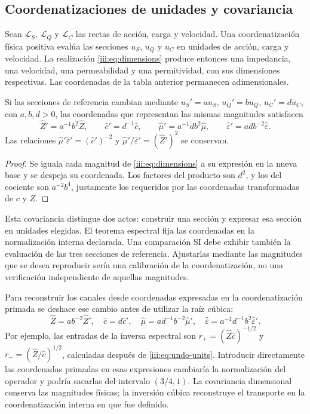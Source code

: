 \subsection{Coordenatizaciones de unidades y covariancia}

Sean $\mathcal L_S$, $\mathcal L_Q$ y $\mathcal L_C$ las rectas de
acción, carga y velocidad. Una coordenatización física positiva evalúa las secciones
$u_S$, $u_Q$ y $u_C$ en unidades de acción, carga y velocidad. La realización
\eqref{iii:eq:dimensions} produce entonces una impedancia, una velocidad,
una permeabilidad y una permitividad, con sus dimensiones respectivas.
Las coordenadas de la tabla anterior permanecen adimensionales.

\begin{proposition}
Si las secciones de referencia cambian mediante
$u_S'=a u_S$, $u_Q'=b u_Q$, $u_C'=d u_C$, con $a,b,d>0$, las
coordenadas que representan las mismas magnitudes satisfacen
\[
 \widehat Z'=a^{-1}b^2\widehat Z,\qquad
 \widehat c'=d^{-1}\widehat c,\qquad
 \widehat\mu'=a^{-1}db^2\widehat\mu,\qquad
 \widehat\varepsilon'=adb^{-2}\widehat\varepsilon.
\]
Las relaciones $\widehat\mu'\widehat\varepsilon'=(\widehat c')^{-2}$
y $\widehat\mu'/\widehat\varepsilon'=(\widehat Z')^2$ se conservan.
\end{proposition}
\begin{proof}
Se iguala cada magnitud de \eqref{iii:eq:dimensions} a su expresión
en la nueva base y se despeja su coordenada. Los factores del producto
son $d^2$, y los del cociente son $a^{-2}b^4$, justamente los requeridos
por las coordenadas transformadas de $c$ y $Z$.
\end{proof}

Esta covariancia distingue dos actos: construir una sección y expresar
esa sección en unidades elegidas. El teorema espectral fija las coordenadas
en la normalización interna declarada. Una comparación SI debe exhibir
también la evaluación de las tres secciones de referencia. Ajustarlas
mediante las magnitudes que se desea reproducir sería una calibración de
la coordenatización, no una verificación independiente de aquellas magnitudes.

Para reconstruir los canales desde coordenadas expresadas en la coordenatización
primada se deshace ese cambio antes de utilizar la raíz cúbica:
\begin{equation}
 \widehat Z=ab^{-2}\widehat Z',\quad
 \widehat c=d\widehat c',\quad
 \widehat\mu=ad^{-1}b^{-2}\widehat\mu',\quad
 \widehat\varepsilon=a^{-1}d^{-1}b^2\widehat\varepsilon'.
 \label{iii:eq:undo-units}
\end{equation}
Por ejemplo, las entradas de la inversa espectral son
$r_+=(\widehat Z\widehat c)^{-1/2}$ y
$r_-=(\widehat Z/\widehat c)^{1/2}$, calculadas después de
\eqref{iii:eq:undo-units}. Introducir directamente las coordenadas primadas
en esas expresiones cambiaría la normalización del operador y podría
sacarlas del intervalo $(3/4,1)$. La covariancia dimensional conserva
las magnitudes físicas; la inversión cúbica reconstruye el transporte
en la coordenatización interna en que fue definido.
